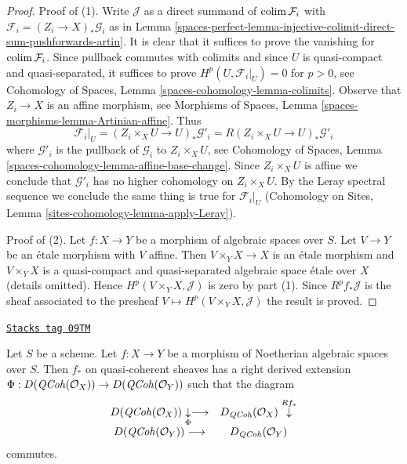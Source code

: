 \begin{proof}
Proof of (1). Write $\mathcal{J}$ as a direct summand of
$\operatorname{colim} \mathcal{F}_i$ with $\mathcal{F}_i = (Z_i \to X)_*\mathcal{G}_i$
as in Lemma \ref{spaces-perfect-lemma-injective-colimit-direct-sum-pushforwards-artin}.
It is clear that it suffices to prove the vanishing for
$\operatorname{colim} \mathcal{F}_i$. Since pullback commutes with colimits
and since $U$ is quasi-compact and quasi-separated, it suffices
to prove $H^p(U, \mathcal{F}_i|_U) = 0$ for $p > 0$, see
Cohomology of Spaces, Lemma \ref{spaces-cohomology-lemma-colimits}.
Observe that $Z_i \to X$ is an affine morphism, see
Morphisms of Spaces, Lemma \ref{spaces-morphisms-lemma-Artinian-affine}.
Thus
$$
\mathcal{F}_i|_U = (Z_i \times_X U \to U)_*\mathcal{G}'_i =
R(Z_i \times_X U \to U)_*\mathcal{G}'_i
$$
where $\mathcal{G}'_i$ is the pullback of $\mathcal{G}_i$
to $Z_i \times_X U$, see
Cohomology of Spaces, Lemma \ref{spaces-cohomology-lemma-affine-base-change}.
Since $Z_i \times_X U$ is affine we conclude that
$\mathcal{G}'_i$ has no higher cohomology on $Z_i \times_X U$.
By the Leray spectral sequence we conclude the same
thing is true for $\mathcal{F}_i|_U$ (Cohomology on Sites,
Lemma \ref{sites-cohomology-lemma-apply-Leray}).

\medskip\noindent
Proof of (2). Let $f : X \to Y$ be a morphism of algebraic spaces
over $S$. Let $V \to Y$ be an \'etale morphism with $V$ affine.
Then $V \times_Y X \to X$ is an \'etale morphism and
$V \times_Y X$ is a quasi-compact and quasi-separated algebraic
space \'etale over $X$ (details omitted). Hence
$H^p(V \times_Y X, \mathcal{J})$ is zero by part (1).
Since $R^pf_*\mathcal{J}$ is the sheaf associated to the presheaf
$V \mapsto H^p(V \times_Y X, \mathcal{J})$ the result is proved.
\end{proof}

\begin{lemma}
\label{spaces-perfect-lemma-Noetherian-pushforward}
\href{https://stacks.math.columbia.edu/tag/09TM}{\texttt{Stacks tag 09TM}}

Let $S$ be a scheme.
Let $f : X \to Y$ be a morphism of Noetherian algebraic spaces over $S$.
Then $f_*$ on quasi-coherent sheaves has a right derived
extension
$\Phi : D(\mathit{QCoh}(\mathcal{O}_X)) \to D(\mathit{QCoh}(\mathcal{O}_Y))$
such that the diagram
$$
\begin{array}{cc}D(\mathit{QCoh}(\mathcal{O}_X)) \underset{\Phi}{\downarrow}\longrightarrow & D_{\mathit{QCoh}}(\mathcal{O}_X) \overset{Rf_*}{\downarrow} \\ D(\mathit{QCoh}(\mathcal{O}_Y)) \longrightarrow & D_{\mathit{QCoh}}(\mathcal{O}_Y)\end{array}
$$
commutes.
\end{lemma}

